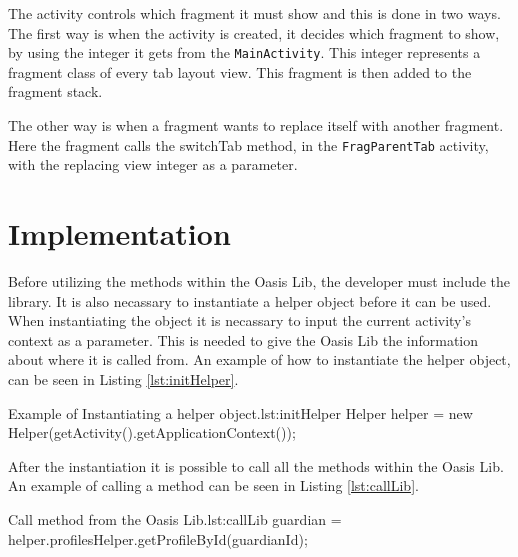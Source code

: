 The activity controls which fragment it must show and this is done in two ways.
The first way is when the activity is created, it decides which fragment to show, by using the integer it gets from the \texttt{MainActivity}.
This integer represents a fragment class of every tab layout view.
This fragment is then added to the fragment stack.

The other way is when a fragment wants to replace itself with another fragment.
Here the fragment calls the switchTab method, in the \texttt{FragParentTab} activity, with the replacing view integer as a parameter.

\section{Implementation}
\label{sec:AppImp}
Before utilizing the methods within the Oasis Lib, the developer must include the library.
It is also necassary to instantiate a helper object before it can be used.
When instantiating the object it is necassary to input the current activity's context as a parameter.
This is needed to give the Oasis Lib the information about where it is called from.
An example of how to instantiate the helper object, can be seen in Listing \vref{lst:initHelper}.

\begin{Java}{Example of Instantiating a helper object.}{lst:initHelper}
Helper helper = new Helper(getActivity().getApplicationContext());
\end{Java}

After the instantiation it is possible to call all the methods within the Oasis Lib.
An example of calling a method can be seen in Listing \vref{lst:callLib}.

\begin{Java}{Call method from the Oasis Lib.}{lst:callLib}
guardian = helper.profilesHelper.getProfileById(guardianId);
\end{Java}